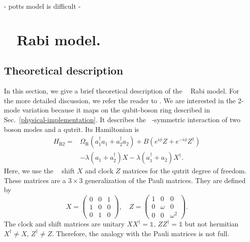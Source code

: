\documentclass[reprint, aps, prx, amsmath, amssymb, longbibliography, superscriptaddress]{revtex4-2}
\DeclareMathOperator{\Zthree}{\mathbb{Z}_3}
\begin{document}

- potts model is difficult
- 


\section{$\Zthree$ Rabi model.}

\subsection{Theoretical description}
\label{sec:rabi-theory}

In this section, we give a brief theoretical description of the $\Zthree$ Rabi model. For the more detailed discussion, we refer the reader to . We are interested in the 2-mode variation because it maps on the qubit-boson ring described in Sec.~\ref{physical-implementation}. It describes the $\Zthree$-symmetric interaction of two boson modes and a qutrit. Its Hamiltonian is
\begin{equation}
\label{2-mode-z3-Rabi}
\begin{aligned}
     H_{\text{R}2} = &\Omega_{\text{R}} ( a_1^{\dagger}  a_1 +  a_2^{\dagger}  a_2) + B (e^{i\phi} Z + e^{-i\phi} Z^{\dagger}) \\
    &- \lambda ( a_1 +  a_2^{\dagger}) X - \lambda ( a_1^{\dagger} +  a_2) X^{\dagger}.
\end{aligned}
\end{equation}
Here, we use the $\Zthree$ shift $X$ and clock $Z$ matrices for the qutrit degree of freedom. These matrices are a $3\times 3$ generalization of the Pauli matrices. They are defined by
\begin{equation}
\label{shift-clock-matreces}
    X = \begin{pmatrix} 
         0 & 0 & 1 \\
         1 & 0 & 0 \\
         0 & 1 & 0 
        \end{pmatrix}, \quad
    Z = \begin{pmatrix}
         1 & 0 & 0 \\
         0 & \omega & 0 \\
         0 & 0 & \omega^2
        \end{pmatrix}.
      \end{equation}
The clock and shift matrices are unitary $ X X^{\dagger} = \mathbb{1}, \, Z Z^{\dagger} = \mathbb{1}$ but not hermitian $ X^{\dagger} \neq X, \, Z^{\dagger} \neq Z$. Therefore, the analogy with the Pauli matrices is not full.
\end{document}

